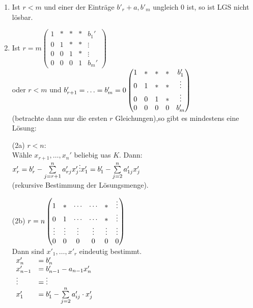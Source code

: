 \begin{enumerate}[(1)]
\item Ist $r < m$ und einer der Einträge $b'_r+a,b'_m$ ungleich 0 ist, so ist LGS nicht lösbar.
\item Ist $r=m \begin{pmatrix}
1 & * & * & * & b_1'\\
0 & 1 & * & * & \vdots\\
0 & 0 & 1 & * & \vdots\\
0 & 0 & 0 & 1 & b_m'
\end{pmatrix}$\\
oder $ r < m$ und $b'_{r+1} = \ldots = b'_m = 0\\
\begin{pmatrix}
1 & * & * & * & b_1'\\
0 & 1 & * & * & \vdots\\
0 & 0 & 1 & * & \vdots\\
0 & 0 & 0 & 0 & b_m'
\end{pmatrix}$\\
(betrachte dann nur die ersten $r$ Gleichungen),so gibt es mindestens eine Lösung:
\item[(2a)] $r<n$:\\
Wähle $x_{r+1}, \ldots,x_n'$ beliebig uas $K$. Dann:\\ $x'_r = b_r' - \sum\limits_{j=r+1}^{n}a'_{rj}x'_j\\
\vdots\\
x'_1 = b'_1 - \sum\limits_{j=2}^{n}a'_{1j}x'_j$\\
(rekursive Bestimmung der Lösungsmenge).\\
\item[(2b)] $r = n\\
\begin{pmatrix}
1&*&\cdots&\cdots&*&\vdots\\
0&1&\cdots&\cdots&*&\vdots\\
\vdots&\vdots&\vdots&\vdots&\vdots&\vdots\\
0&0&0&0&0&0
\end{pmatrix}$\\
Dann sind $x'_1,\ldots,x'_r$ eindeutig bestimmt.\\
$\begin{array}{ll}
x_n' &=b'_n\\
x'_{n-1}&= b'_{n-1}-a_{n-1}x'_n\\
\vdots &= \vdots\\
x'_1 &=b'_1 - \sum\limits_{j=2}^{n} a'_{ij}\cdot x_j'
\end{array}
$\end{enumerate}
